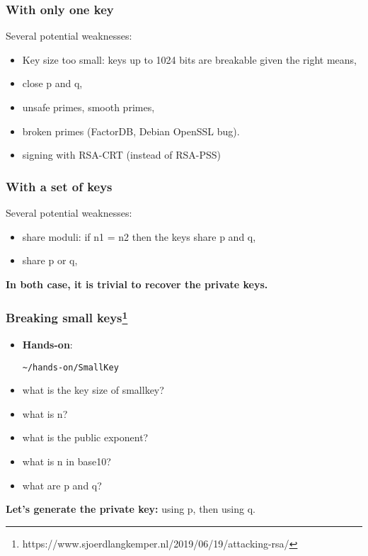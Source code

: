 \begin{frame}
  \frametitle{With only one key}
  Several potential weaknesses:
  \begin{itemize}
    \item Key size too small: keys up to 1024 bits are breakable given the
      right means,
    \item close p and q,
    \item unsafe primes, smooth primes,
    \item broken primes (FactorDB, Debian OpenSSL bug).
    \item signing with RSA-CRT (instead of RSA-PSS)
  \end{itemize}

\end{frame}

\begin{frame}
  \frametitle{With a set of  keys}
  Several potential weaknesses:
  \begin{itemize}
   \item share moduli: if n1 = n2 then the keys share p and q,
   \item share p or q,
  \end{itemize}
 \vspace{10mm}
  {\bf In both case, it is trivial to recover the private keys.}
\end{frame}


\begin{frame}[fragile]
  \frametitle{Breaking small keys\footnote{https://www.sjoerdlangkemper.nl/2019/06/19/attacking-rsa/}}
  \begin{itemize}
\item {\bf Hands-on}:

\begin{lstlisting}
~/hands-on/SmallKey
\end{lstlisting}

   \item what is the key size of smallkey?
   \item what is n?
   \item what is the public exponent?
   \item what is n in base10?
   \item what are p and q?
   
  \end{itemize}

  \vspace{8mm}
  {\bf Let's generate the private key: }using p, then using q.
  
\end{frame}

